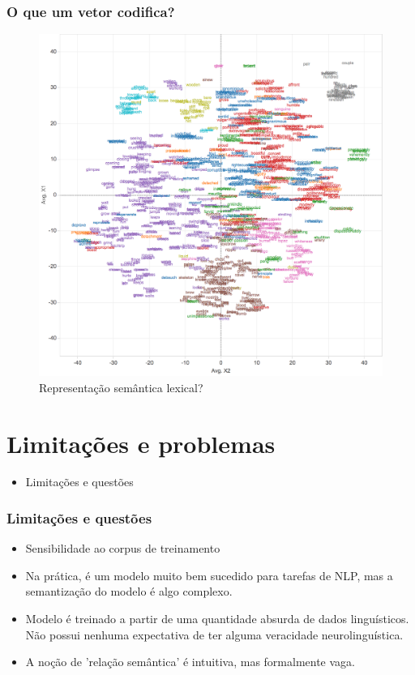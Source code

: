 \documentclass{beamer}
\begin{document}
\begin{frame}
\frametitle{ O que um vetor codifica?}
\begin{figure}
	\centering
	\includegraphics[width=0.7\linewidth]{Fields-to-Vectors-All-words2}
	\caption{Representação semântica lexical?}
	\label{fig:fields-to-vectors-all-words2}
\end{figure}

\end{frame}



\section{Limitações e problemas}

\begin{frame}
\begin{itemize}
    \item \Large{Limitações e questões}

\end{itemize}

\end{frame}


\begin{frame}
\frametitle{Limitações e questões}
\begin{itemize}
\item Sensibilidade ao corpus de treinamento
\item Na prática, é um modelo muito bem sucedido para tarefas de NLP, mas a semantização do modelo é algo complexo.
\item Modelo é treinado a partir de uma quantidade absurda de dados linguísticos. Não possui nenhuma expectativa de ter alguma veracidade neurolinguística.
\item A noção de 'relação semântica' é intuitiva, mas formalmente vaga.
\end{itemize}
\end{frame}
\end{document}
